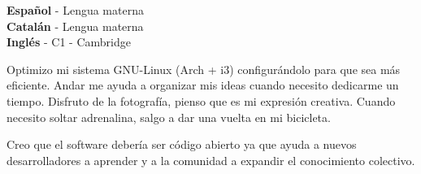 \documentclass[9pt]{developercv} %
\begin{document}

\begin{minipage}[t]{0.3\textwidth}
	\vspace{-\baselineskip} %

	
	\textbf{Español} - Lengua materna\\
	\textbf{Catalán} - Lengua materna\\
	\textbf{Inglés} -  C1 - Cambridge
\end{minipage}
\hfill
\begin{minipage}[t]{0.3\textwidth}
	\vspace{-\baselineskip} %
	
	
  Optimizo mi sistema GNU-Linux (Arch + i3) configurándolo para que sea más eficiente.
  Andar me ayuda a organizar mis ideas cuando necesito dedicarme un tiempo.
  Disfruto de la fotografía, pienso que es mi expresión creativa.
  Cuando necesito soltar adrenalina, salgo a dar una vuelta en mi bicicleta.
\end{minipage}
\hfill
\begin{minipage}[t]{0.3\textwidth}
	\vspace{-\baselineskip} %
	

	Creo que el software debería ser código abierto ya que ayuda a nuevos desarrolladores a aprender y a la comunidad a expandir el conocimiento colectivo. 
\end{minipage}

\end{document}
